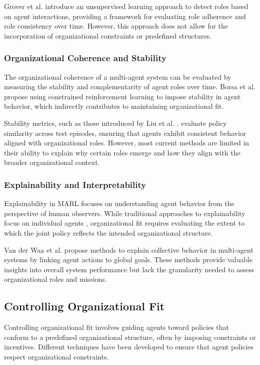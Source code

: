 \documentclass[sigconf,anonymous]{aamas}
\begin{document}
Grover et al. \cite{grover2018role} introduce an unsupervised learning approach to detect roles based on agent interactions, providing a framework for evaluating role adherence and role consistency over time. However, this approach does not allow for the incorporation of organizational constraints or predefined structures.

\subsubsection{Organizational Coherence and Stability}
The organizational coherence of a multi-agent system can be evaluated by measuring the stability and complementarity of agent roles over time. Borsa et al. \cite{borsa2019constrained} propose using constrained reinforcement learning to impose stability in agent behavior, which indirectly contributes to maintaining organizational fit.

Stability metrics, such as those introduced by Liu et al. \cite{liu2021efficient}, evaluate policy similarity across test episodes, ensuring that agents exhibit consistent behavior aligned with organizational roles. However, most current methods are limited in their ability to explain why certain roles emerge and how they align with the broader organizational context.

\subsubsection{Explainability and Interpretability}
Explainability in MARL focuses on understanding agent behavior from the perspective of human observers. While traditional approaches to explainability focus on individual agents \cite{van2018explainable}, organizational fit requires evaluating the extent to which the joint policy reflects the intended organizational structure.

Van der Waa et al. \cite{van2020explainability} propose methods to explain collective behavior in multi-agent systems by linking agent actions to global goals. These methods provide valuable insights into overall system performance but lack the granularity needed to assess organizational roles and missions.

\subsection{Controlling Organizational Fit}
Controlling organizational fit involves guiding agents toward policies that conform to a predefined organizational structure, often by imposing constraints or incentives. Different techniques have been developed to ensure that agent policies respect organizational constraints.
\end{document}
